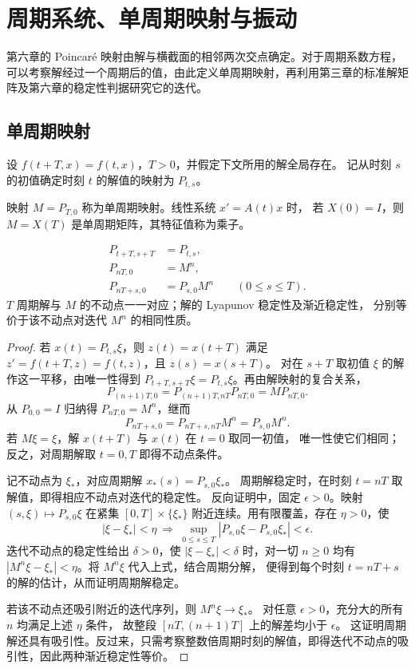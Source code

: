 \chapter{周期系统、单周期映射与振动}\label{chap:periodic}

第六章的 Poincar\'e 映射由解与横截面的相邻两次交点确定。对于周期系数方程，可以考察解经过一个周期后的值，由此定义单周期映射，再利用第三章的标准解矩阵及第六章的稳定性判据研究它的迭代。

\section{单周期映射}
设 $f(t+T,x)=f(t,x)$，$T>0$，并假定下文所用的解全局存在。
记从时刻 $s$ 的初值确定时刻 $t$ 的解值的映射为 $P_{t,s}$。
\begin{definition}
映射 $M=P_{T,0}$ 称为单周期映射。线性系统 $x'=A(t)x$ 时，
若 $X(0)=I$，则 $M=X(T)$ 是单周期矩阵，其特征值称为乘子。
\end{definition}
\begin{theorem}
\[
 \begin{aligned}
 P_{t+T,s+T}&=P_{t,s},\\
 P_{nT,0}&=M^n,\\
 P_{nT+s,0}&=P_{s,0}M^n\qquad(0\leq s\leq T).
\end{aligned}
\]
$T$ 周期解与 $M$ 的不动点一一对应；解的 Lyapunov 稳定性及渐近稳定性，
分别等价于该不动点对迭代 $M^n$ 的相同性质。
\end{theorem}
\begin{proof}
若 $x(t)=P_{t,s}\xi$，则 $z(t)=x(t+T)$ 满足
$z'=f(t+T,z)=f(t,z)$，且 $z(s)=x(s+T)$。
对在 $s+T$ 取初值 $\xi$ 的解作这一平移，由唯一性得到
$P_{t+T,s+T}\xi=P_{t,s}\xi$。再由解映射的复合关系，
\[
 P_{(n+1)T,0}=P_{(n+1)T,nT}P_{nT,0}=MP_{nT,0}.
\]
从 $P_{0,0}=I$ 归纳得 $P_{nT,0}=M^n$，继而
\[
 P_{nT+s,0}=P_{nT+s,nT}M^n=P_{s,0}M^n.
\]
若 $M\xi=\xi$，解 $x(t+T)$ 与 $x(t)$ 在 $t=0$ 取同一初值，
唯一性使它们相同；反之，对周期解取 $t=0,T$ 即得不动点条件。

记不动点为 $\xi_*$，对应周期解 $x_*(s)=P_{s,0}\xi_*$。
周期解稳定时，在时刻 $t=nT$ 取解值，即得相应不动点对迭代的稳定性。
反向证明中，固定 $\epsilon>0$。映射 $(s,\xi)\mapsto P_{s,0}\xi$
在紧集 $[0,T]\times\{\xi_*\}$ 附近连续。用有限覆盖，存在 $\eta>0$，使
\[
 |\xi-\xi_*|<\eta\ \Longrightarrow\
 \sup_{0\leq s\leq T}|P_{s,0}\xi-P_{s,0}\xi_*|<\epsilon.
\]
迭代不动点的稳定性给出 $\delta>0$，使 $|\xi-\xi_*|<\delta$ 时，对一切 $n\geq0$
均有 $|M^n\xi-\xi_*|<\eta$。将 $M^n\xi$ 代入上式，结合周期分解，
便得到每个时刻 $t=nT+s$ 的解的估计，从而证明周期解稳定。

若该不动点还吸引附近的迭代序列，则 $M^n\xi\to\xi_*$。
对任意 $\epsilon>0$，充分大的所有 $n$ 均满足上述 $\eta$ 条件，
故整段 $[nT,(n+1)T]$ 上的解差均小于 $\epsilon$。
这证明周期解还具有吸引性。反过来，只需考察整数倍周期时刻的解值，即得迭代不动点的吸引性，因此两种渐近稳定性等价。
\end{proof}
